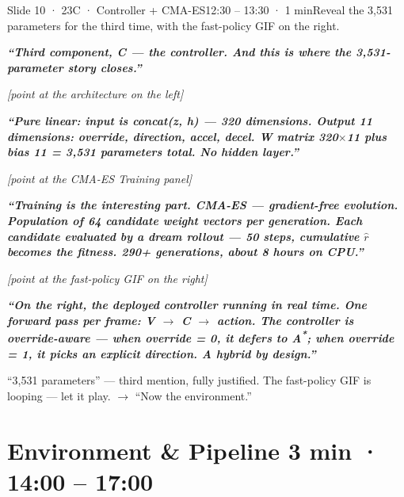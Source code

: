 \documentclass[11pt,a4paper]{article}
\newcommand{\say}[1]{%
    \par\vspace{0.3em}%
    \begingroup
    \leftskip=12pt
    \rightskip=8pt
    \color{thStrong}%
    \itshape\textbf{“#1”}%
    \par
    \endgroup
    \vspace{0.2em}
}
\newcommand{\stage}[1]{%
    \par\textcolor{thMuted}{\small\textit{[#1]}}\par
    \vspace{0.2em}
}
\newcommand{\emphw}[1]{\textbf{\textcolor{thAmber}{#1}}}
\newcommand{\emphteal}[1]{\textbf{\textcolor{thTeal}{#1}}}
\begin{document}
\begin{slide}{Slide 10 · 23}{C · Controller + CMA-ES}{12:30 – 13:30 · 1 min}{Reveal the 3,531 parameters for the third time, with the fast-policy GIF on the right.}
\say{Third component, C — the controller. And this is where the 3{,}531-parameter story closes.}

\stage{point at the architecture on the left}

\say{Pure linear: input is concat(z, h) — 320 dimensions. Output 11 dimensions: override, direction, accel, decel. \emphw{W matrix 320$\times$11 plus bias 11 = 3{,}531 parameters total.} No hidden layer.}

\stage{point at the CMA-ES Training panel}

\say{Training is the interesting part. \emphw{CMA-ES} — gradient-free evolution. Population of \textbf{64 candidate weight vectors per generation}. Each candidate evaluated by a \emphteal{dream rollout} — 50 steps, cumulative $\hat{r}$ becomes the fitness. \textbf{290+ generations, about 8 hours on CPU.}}

\stage{point at the fast-policy GIF on the right}

\say{On the right, the \emphw{deployed controller running in real time}. One forward pass per frame: V $\rightarrow$ C $\rightarrow$ action. The controller is \textbf{override-aware} — when override = 0, it defers to A\textsuperscript{*}; when override = 1, it picks an explicit direction. A hybrid by design.}

\begin{stagebox}
``3,531 parameters'' — third mention, fully justified. The fast-policy GIF is looping — let it play. $\rightarrow$ ``Now the environment.''
\end{stagebox}
\end{slide}

\section{Environment \& Pipeline \hfill \textcolor{thMuted}{\small 3 min · 14:00 – 17:00}}
\end{document}
